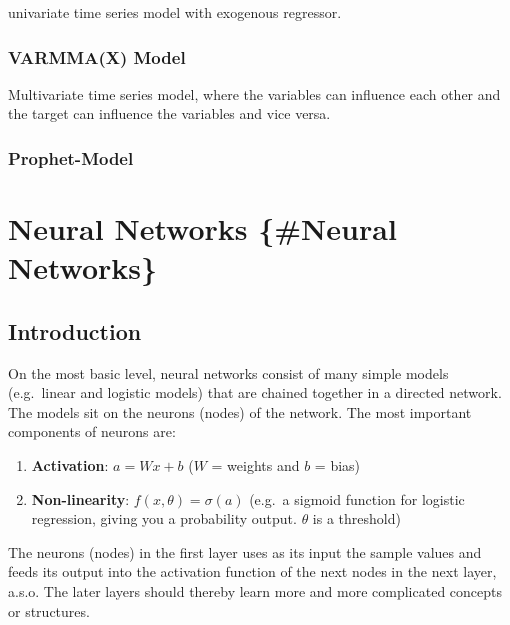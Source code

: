 \documentclass[
]{book}
\begin{document}
univariate time series model with exogenous regressor.

\hypertarget{varmmax-model}{%
\subsection{VARMMA(X) Model}\label{varmmax-model}}

Multivariate time series model, where the variables can influence each
other and the target can influence the variables and vice versa.

\hypertarget{prophet-model}{%
\subsection{Prophet-Model}\label{prophet-model}}

\hypertarget{neural-networks-neural-networks}{%
\chapter{Neural Networks \{\#Neural Networks\}}\label{neural-networks-neural-networks}}

\hypertarget{introduction}{%
\section{Introduction}\label{introduction}}

On the most basic level, neural networks consist of many simple models
(e.g.~linear and logistic models) that are chained together in a
directed network. The models sit on the neurons (nodes) of the network.
The most important components of neurons are:

\begin{enumerate}
\def\labelenumi{\arabic{enumi}.}
\item
  \textbf{Activation}: \(a = Wx+b\) (\(W\) = weights and \(b\) = bias)
\item
  \textbf{Non-linearity}: \(f(x, \theta)=\sigma(a)\) (e.g.~a sigmoid function
  for logistic regression, giving you a probability output. \(\theta\)
  is a threshold)
\end{enumerate}

The neurons (nodes) in the first layer uses as its input the sample
values and feeds its output into the activation function of the next
nodes in the next layer, a.s.o. The later layers should thereby learn
more and more complicated concepts or structures.
\end{document}
